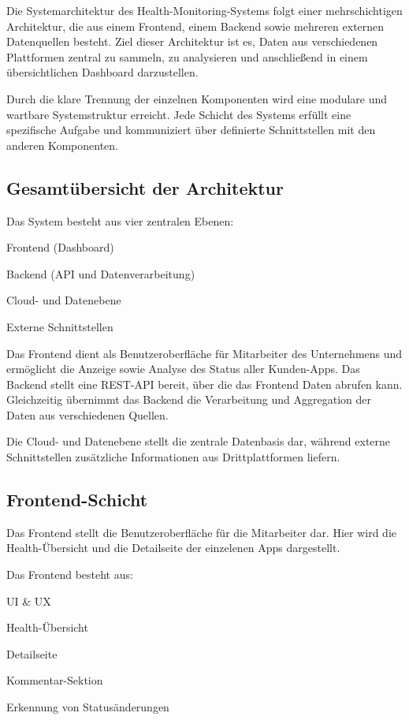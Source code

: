 Die Systemarchitektur des Health-Monitoring-Systems folgt einer mehrschichtigen Architektur, die aus einem Frontend, einem Backend sowie mehreren externen Datenquellen besteht. Ziel dieser Architektur ist es, Daten aus verschiedenen Plattformen zentral zu sammeln, zu analysieren und anschließend in einem übersichtlichen Dashboard darzustellen.

Durch die klare Trennung der einzelnen Komponenten wird eine modulare und wartbare Systemstruktur erreicht. Jede Schicht des Systems erfüllt eine spezifische Aufgabe und kommuniziert über definierte Schnittstellen mit den anderen Komponenten.


\subsection{Gesamtübersicht der Architektur}
Das System besteht aus vier zentralen Ebenen:

\begin{compactitem}
    \item Frontend (Dashboard)
    \item Backend (API und Datenverarbeitung)
    \item Cloud- und Datenebene
    \item Externe Schnittstellen 
\end{compactitem}

Das Frontend dient als Benutzeroberfläche für Mitarbeiter des Unternehmens und ermöglicht die Anzeige sowie Analyse des Status aller Kunden-Apps. Das Backend stellt eine REST-API bereit, über die das Frontend Daten abrufen kann. Gleichzeitig übernimmt das Backend die Verarbeitung und Aggregation der Daten aus verschiedenen Quellen.

Die Cloud- und Datenebene stellt die zentrale Datenbasis dar, während externe Schnittstellen zusätzliche Informationen aus Drittplattformen liefern.


\subsection{Frontend-Schicht}
Das Frontend stellt die Benutzeroberfläche für die Mitarbeiter dar. Hier wird die Health-Übersicht und die Detailseite der einzelenen Apps dargestellt.

Das Frontend besteht aus:

\begin{compactitem}
    \item UI \& UX
    \item Health-Übersicht
    \item Detailseite
    \item Kommentar-Sektion
    \item Erkennung von Statusänderungen
\end{compactitem}


